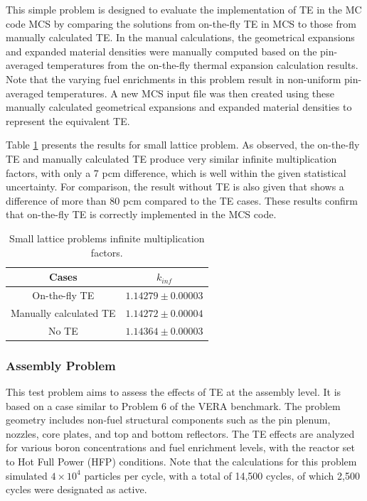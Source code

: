 This simple problem is designed to evaluate the implementation of TE in the MC code MCS by comparing the solutions from on-the-fly TE in MCS to those from manually calculated TE. In the manual calculations, the geometrical expansions and expanded material densities were manually computed based on the pin-averaged temperatures from the on-the-fly thermal expansion calculation results. Note that the varying fuel enrichments in this problem result in non-uniform pin-averaged temperatures. A new MCS input file was then created using these manually calculated geometrical expansions and expanded material densities to represent the equivalent TE.

Table \ref{tab42a} presents the results for small lattice problem. As observed, the on-the-fly TE and manually calculated TE produce very similar infinite multiplication factors, with only a 7 pcm difference, which is well within the given statistical uncertainty. For comparison, the result without TE is also given that shows a difference of more than 80 pcm compared to the TE cases. These results confirm that on-the-fly TE is correctly implemented in the MCS code.

\begin{table}
    \centering
    \caption{Small lattice problems infinite multiplication factors.}
    \label{tab42a} 
    \begin{tabular}{| c | c |}
    \hline 
     Cases & $k_{inf}$ \\
     \hline
     On-the-fly TE          & $1.14279\pm0.00003$     \\ \hline
     Manually calculated TE & $1.14272\pm0.00004$    \\ \hline
     No TE                  & $1.14364\pm0.00003$    \\ \hline
    \end{tabular}
\end{table}


\subsubsection{Assembly Problem}

This test problem aims to assess the effects of TE at the assembly level. It is based on a case similar to Problem 6 of the VERA benchmark. The problem geometry includes non-fuel structural components such as the pin plenum, nozzles, core plates, and top and bottom reflectors. The TE effects are analyzed for various boron concentrations and fuel enrichment levels, with the reactor set to Hot Full Power (HFP) conditions. Note that the calculations for this problem simulated $4\times10^4$ particles per cycle, with a total of 14,500 cycles, of which 2,500 cycles were designated as active.

